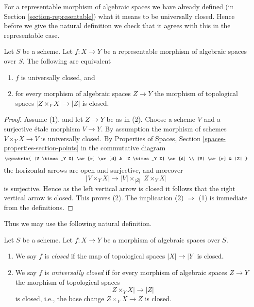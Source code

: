 \noindent
For a representable morphism of algebraic spaces we have already defined (in
Section \ref{section-representable})
what it means to be universally closed. Hence before we give the natural
definition we check that it agrees with this in the representable case.

\begin{lemma}
\label{lemma-characterize-representable-universally-closed}
Let $S$ be a scheme. Let $f : X \to Y$ be a representable morphism of
algebraic spaces over $S$. The following are equivalent
\begin{enumerate}
\item $f$ is universally closed, and
\item for every morphism of algebraic spaces $Z \to Y$ the morphism of
topological spaces $|Z \times_Y X| \to |Z|$ is closed.
\end{enumerate}
\end{lemma}

\begin{proof}
Assume (1), and let $Z \to Y$ be as in (2). Choose a scheme $V$ and
a surjective \'etale morphism $V \to Y$. By assumption the morphism
of schemes $V \times_Y X \to V$ is universally closed. By
Properties of Spaces, Section \ref{spaces-properties-section-points}
in the commutative diagram
$$
\xymatrix{
|V \times_Y X| \ar[r] \ar[d] & |Z \times_Y X| \ar[d] \\
|V| \ar[r] & |Z|
}
$$
the horizontal arrows are open and surjective, and moreover
$$
|V \times_Y X| \longrightarrow |V| \times_{|Z|} |Z \times_Y X|
$$
is surjective. Hence as the left
vertical arrow is closed it follows that the right vertical arrow is
closed. This proves (2). The implication (2) $\Rightarrow$ (1) is
immediate from the definitions.
\end{proof}

\noindent
Thus we may use the following natural definition.

\begin{definition}
\label{definition-closed}
Let $S$ be a scheme. Let $f : X \to Y$ be a morphism of algebraic spaces
over $S$.
\begin{enumerate}
\item We say $f$ is {\it closed} if the map of topological
spaces $|X| \to |Y|$ is closed.
\item We say $f$ is {\it universally closed} if for every morphism
of algebraic spaces $Z \to Y$ the morphism of topological spaces
$$
|Z \times_Y X| \to |Z|
$$
is closed, i.e., the base change $Z \times_Y X \to Z$ is closed.
\end{enumerate}
\end{definition}

